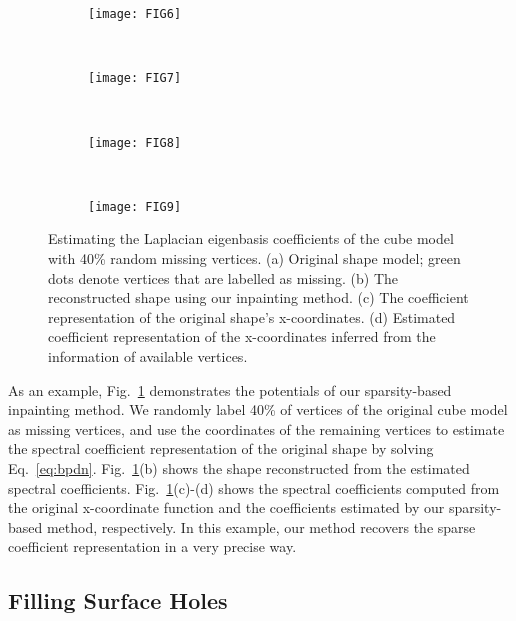 \begin{figure}
    \centering
    \begin{subfigure}[b]{0.36\linewidth}
        \texttt{[image: FIG6]}
        \caption{}
    \end{subfigure}%
    ~
    \begin{subfigure}[b]{0.36\linewidth}
        \texttt{[image: FIG7]}
        \caption{}
    \end{subfigure}%
    \\
    \begin{subfigure}[b]{0.4\linewidth}
        \texttt{[image: FIG8]}
        \caption{}
    \end{subfigure}%
    ~
    \begin{subfigure}[b]{0.4\linewidth}
        \texttt{[image: FIG9]}
        \caption{}
    \end{subfigure}%
    \caption[Estimating Laplacian eigenbasis coefficients with partial cube model.]
      {Estimating the Laplacian eigenbasis coefficients of the
      cube model with 40\% random missing vertices. (a) Original shape model;
      green dots denote vertices that are labelled as missing. (b) The
      reconstructed shape using our inpainting method. (c) The
      coefficient representation of the original shape's
      x-coordinates. (d) Estimated coefficient representation of the
      x-coordinates inferred from the information of available
      vertices. }
\label{fig:cube:random:inpaint}
\end{figure}

As an example, Fig.~\ref{fig:cube:random:inpaint} demonstrates the
potentials of our sparsity-based inpainting method. We randomly label
40\% of vertices of the original cube model as missing vertices, and
use the coordinates of the remaining vertices to estimate the spectral
coefficient representation of the original shape by solving
Eq.~\ref{eq:bpdn}. Fig.~\ref{fig:cube:random:inpaint}(b) shows the
shape reconstructed from the estimated spectral coefficients.
Fig.~\ref{fig:cube:random:inpaint}(c)-(d) shows the spectral
coefficients computed from the original x-coordinate function and the
coefficients estimated by our sparsity-based method, respectively. In
this example, our method recovers the sparse coefficient
representation in a very precise way.


\subsection{Filling Surface Holes}
\label{sec:inpaint:holefilling}


